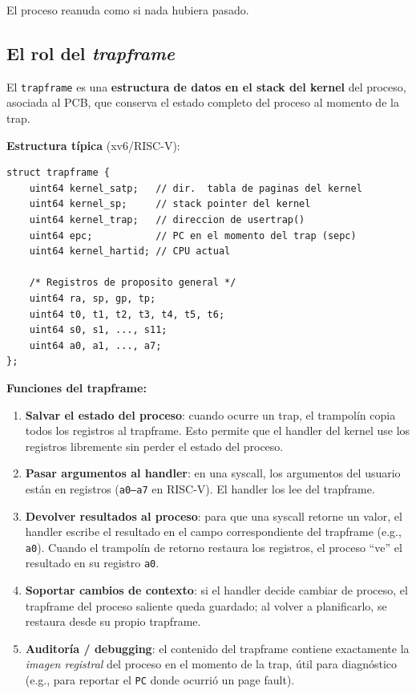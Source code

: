 \documentclass[11pt,a4paper]{article}
\begin{document}
El proceso reanuda como si nada hubiera pasado.

\subsection*{El rol del \emph{trapframe}}

El \texttt{trapframe} es una \textbf{estructura de datos en el stack
del kernel} del proceso, asociada al PCB, que conserva el estado
completo del proceso al momento de la trap.

\textbf{Estructura típica} (xv6/RISC-V):

\begin{lstlisting}[style=cstyle]
struct trapframe {
    uint64 kernel_satp;   // dir.  tabla de paginas del kernel
    uint64 kernel_sp;     // stack pointer del kernel
    uint64 kernel_trap;   // direccion de usertrap()
    uint64 epc;           // PC en el momento del trap (sepc)
    uint64 kernel_hartid; // CPU actual

    /* Registros de proposito general */
    uint64 ra, sp, gp, tp;
    uint64 t0, t1, t2, t3, t4, t5, t6;
    uint64 s0, s1, ..., s11;
    uint64 a0, a1, ..., a7;
};
\end{lstlisting}

\textbf{Funciones del trapframe:}

\begin{enumerate}[leftmargin=*]
    \item \textbf{Salvar el estado del proceso}: cuando ocurre un
        trap, el trampolín copia todos los registros al trapframe.
        Esto permite que el handler del kernel use los registros
        libremente sin perder el estado del proceso.

    \item \textbf{Pasar argumentos al handler}: en una syscall, los
        argumentos del usuario están en registros (\texttt{a0--a7}
        en RISC-V). El handler los lee del trapframe.

    \item \textbf{Devolver resultados al proceso}: para que una
        syscall retorne un valor, el handler escribe el resultado en
        el campo correspondiente del trapframe (e.g., \texttt{a0}).
        Cuando el trampolín de retorno restaura los registros, el
        proceso ``ve'' el resultado en su registro \texttt{a0}.

    \item \textbf{Soportar cambios de contexto}: si el handler decide
        cambiar de proceso, el trapframe del proceso saliente queda
        guardado; al volver a planificarlo, se restaura desde su
        propio trapframe.

    \item \textbf{Auditoría / debugging}: el contenido del trapframe
        contiene exactamente la \emph{imagen registral} del proceso
        en el momento de la trap, útil para diagnóstico (e.g.,
        para reportar el \texttt{PC} donde ocurrió un page fault).
\end{enumerate}
\end{document}
